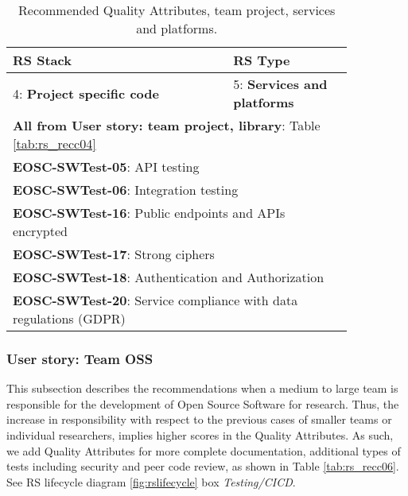 \begin{table}[h]
  \centering
  \scriptsize
  \begin{tabular}{|p{0.55\linewidth}|p{0.3\linewidth}|} \hline

    \textbf{RS Stack} & \textbf{RS Type} \\ \hline \hline
    4: \textbf{Project specific code} & 5: \textbf{Services and platforms} \\ \hline
    \multicolumn{2}{|l|}{\textbf{All from User story: team project, library}: Table \ref{tab:rs_recc04}} \\ \hline
    \multicolumn{2}{|l|}{\textbf{EOSC-SWTest-05}: API testing} \\ \hline
    \multicolumn{2}{|l|}{\textbf{EOSC-SWTest-06}: Integration testing} \\ \hline
    \multicolumn{2}{|l|}{\textbf{EOSC-SWTest-16}: Public endpoints and APIs encrypted} \\ \hline
    \multicolumn{2}{|l|}{\textbf{EOSC-SWTest-17}: Strong ciphers} \\ \hline
    \multicolumn{2}{|l|}{\textbf{EOSC-SWTest-18}: Authentication and Authorization} \\ \hline
    \multicolumn{2}{|l|}{\textbf{EOSC-SWTest-20}: Service compliance with data regulations (GDPR)} \\ \hline

  \end{tabular}
  \caption{Recommended Quality Attributes, team project, services and platforms.}
  \label{tab:rs_recc05}
\end{table}

\subsubsection{User story: Team OSS}

This subsection describes the recommendations when a medium to large team is responsible for the development of Open Source Software for research. Thus, the increase in responsibility with respect to the previous cases of smaller teams or individual researchers, implies higher scores in the Quality Attributes. As such, we add Quality Attributes for more complete documentation, additional types of tests including security and peer code review, as shown in Table \ref{tab:rs_recc06}. See RS lifecycle diagram \ref{fig:rslifecycle} box \textit{Testing/CICD}.

